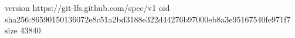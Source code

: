 version https://git-lfs.github.com/spec/v1
oid sha256:86590150136072e8c51a2bd3188e322d44276b97000eb8a3e95167540fe971f7
size 43840
